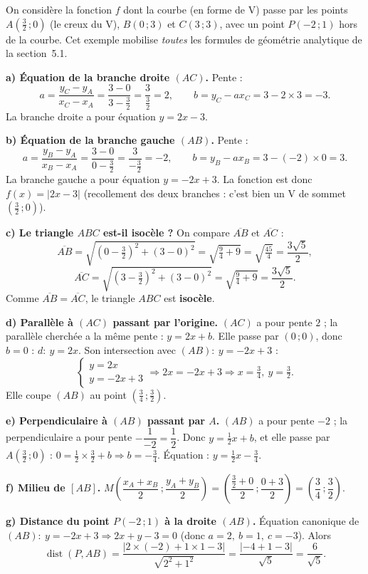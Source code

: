 \documentclass[11pt,a4paper]{article}
\begin{document}
\begin{exemple}
On considère la fonction $f$ dont la courbe (en forme de V) passe par les points
$A\left(\tfrac32\,;0\right)$ (le creux du V), $B(0\,;3)$ et $C(3\,;3)$, avec un point
$P(-2\,;1)$ hors de la courbe. Cet exemple mobilise \emph{toutes} les formules de
géométrie analytique de la section~5.1.

\medskip
\textbf{a) Équation de la branche droite $(AC)$.} Pente :
\[
  a=\frac{y_C-y_A}{x_C-x_A}=\frac{3-0}{3-\tfrac32}=\frac{3}{\tfrac32}=2,
  \qquad b=y_C-a x_C=3-2\times 3=-3 .
\]
La branche droite a pour équation $y=2x-3$.

\textbf{b) Équation de la branche gauche $(AB)$.} Pente :
\[
  a=\frac{y_B-y_A}{x_B-x_A}=\frac{3-0}{0-\tfrac32}=\frac{3}{-\tfrac32}=-2,
  \qquad b=y_B-a x_B=3-(-2)\times 0=3 .
\]
La branche gauche a pour équation $y=-2x+3$. La fonction est donc
$f(x)=\lvert 2x-3\rvert$ (recollement des deux branches : c'est bien un V de sommet
$\left(\tfrac32\,;0\right)$).

\textbf{c) Le triangle $ABC$ est-il isocèle ?} On compare $\overline{AB}$ et $\overline{AC}$ :
\[
  \overline{AB}=\sqrt{(0-\tfrac32)^2+(3-0)^2}=\sqrt{\tfrac94+9}=\sqrt{\tfrac{45}{4}}=\frac{3\sqrt5}{2},
\]
\[
  \overline{AC}=\sqrt{(3-\tfrac32)^2+(3-0)^2}=\sqrt{\tfrac94+9}=\frac{3\sqrt5}{2}.
\]
Comme $\overline{AB}=\overline{AC}$, le triangle $ABC$ est \textbf{isocèle}. \checkmark

\textbf{d) Parallèle à $(AC)$ passant par l'origine.} $(AC)$ a pour pente $2$ ; la
parallèle cherchée a la même pente : $y=2x+b$. Elle passe par $(0\,;0)$, donc $b=0$ :
$d:\ y=2x$. Son intersection avec $(AB):\ y=-2x+3$ :
\[
  \begin{cases} y=2x\\ y=-2x+3\end{cases}\Rightarrow 2x=-2x+3\Rightarrow x=\tfrac34,\ y=\tfrac32.
\]
Elle coupe $(AB)$ au point $\left(\tfrac34\,;\tfrac32\right)$.

\textbf{e) Perpendiculaire à $(AB)$ passant par $A$.} $(AB)$ a pour pente $-2$ ; la
perpendiculaire a pour pente $-\dfrac{1}{-2}=\dfrac12$. Donc $y=\tfrac12 x+b$, et elle
passe par $A\left(\tfrac32\,;0\right)$ : $0=\tfrac12\times\tfrac32+b\Rightarrow b=-\tfrac34$.
Équation : $y=\tfrac12 x-\tfrac34$.

\textbf{f) Milieu de $[AB]$.}
$M\left(\dfrac{x_A+x_B}{2}\,;\dfrac{y_A+y_B}{2}\right)
 =\left(\dfrac{\tfrac32+0}{2}\,;\dfrac{0+3}{2}\right)=\left(\dfrac34\,;\dfrac32\right)$.

\textbf{g) Distance du point $P(-2\,;1)$ à la droite $(AB)$.} Équation canonique de
$(AB):\ y=-2x+3 \Rightarrow 2x+y-3=0$ (donc $a=2,\ b=1,\ c=-3$). Alors
\[
  \operatorname{dist}(P,AB)=\frac{\lvert 2\times(-2)+1\times 1-3\rvert}{\sqrt{2^2+1^2}}
  =\frac{\lvert -4+1-3\rvert}{\sqrt5}=\frac{6}{\sqrt5}.
\]
\end{exemple}
\end{document}
